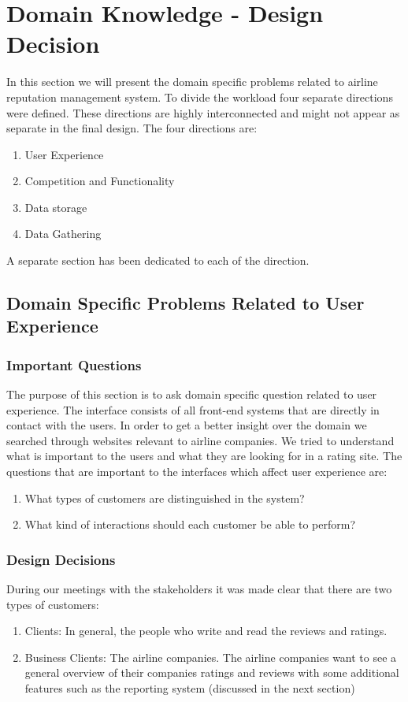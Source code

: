 \documentclass{article}
\begin{document}
\appendix

\section{Domain Knowledge - Design Decision}
In this section we will present the domain specific problems related to airline reputation management system. To divide the workload four separate directions were defined. These  
directions are highly interconnected and might not appear as separate in the final design. The four directions are:
\begin{enumerate}
\item User Experience
\item Competition and Functionality
\item Data storage
\item Data Gathering
\end{enumerate}
A separate section has been dedicated to each of the direction. 

\subsection{Domain Specific Problems Related to User Experience}
\subsubsection{Important Questions}
The purpose of this section is to ask domain specific question related to user experience. The interface consists of all front-end systems that are directly in contact with the users. 
In order to get a better insight over the domain we searched through websites relevant to airline companies. We tried to understand what is important to the users and what they are looking for in
a rating site. The questions that  are important to the interfaces which affect user experience are:
\begin{enumerate}
\item What types of customers are distinguished in the system?
\item What kind of interactions should each customer be able to perform?
\end{enumerate}

\subsubsection{Design Decisions}
During our meetings with the stakeholders it was made clear that there are two types of customers:
\begin{enumerate} 
\item Clients: In general, the people who write and read the reviews and ratings.
\item Business Clients: The airline companies. The airline companies want to see a general overview of their companies ratings and reviews with some additional features such as the 
reporting system (discussed in the next section)
\end{enumerate}
\end{document}
